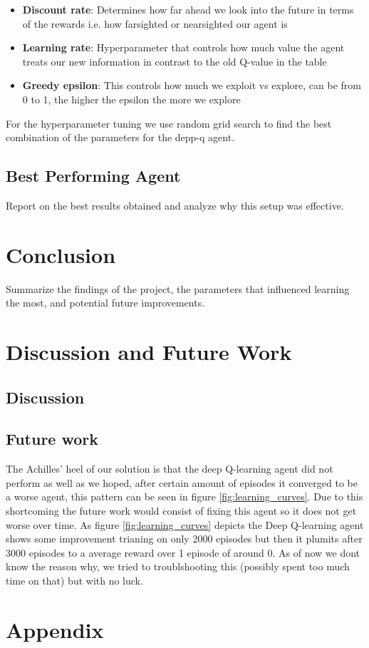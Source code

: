 \documentclass[a4paper,12pt]{article}
\begin{document}
\begin{itemize}
    \item \textbf{Discount rate}: Determines how far ahead we look into the future in terms of the rewards i.e. how farsighted or nearsighted our agent is
    \item \textbf{Learning rate}: Hyperparameter that controls how much value the agent treats our new information in contrast to the old Q-value in the table 
    \item \textbf{Greedy epsilon}: This controls how much we exploit vs explore, can be from 0 to 1, the higher the epsilon the more we explore 
\end{itemize}
For the hyperparameter tuning we use random grid search to find the best combination of the parameters for the depp-q agent.

\subsection{Best Performing Agent}
Report on the best results obtained and analyze why this setup was effective.

\section{Conclusion}
Summarize the findings of the project, the parameters that influenced learning the most, and potential future improvements.





\section{Discussion and Future Work}
\subsection{Discussion}
\subsection{Future work}
The Achilles' heel of our solution is that the deep Q-learning agent did not perform as well as we hoped, 
after certain amount of episodes it converged to be a worse agent, this pattern can be seen in figure \ref{fig:learning_curves}.
Due to this shortcoming the future work would consist of fixing this agent so it does not get worse over time. 
As figure \ref{fig:learning_curves} depicts the Deep Q-learning agent shows some improvement trianing on only 2000 episodes but then it plumits after 3000 episodes to a average reward over 1 episode of around 0. 
As of now we dont know the reason why, we tried to troublshooting this (possibly spent too much time on that) but with no luck. 


\clearpage

\appendix
\section*{Appendix}
\end{document}
